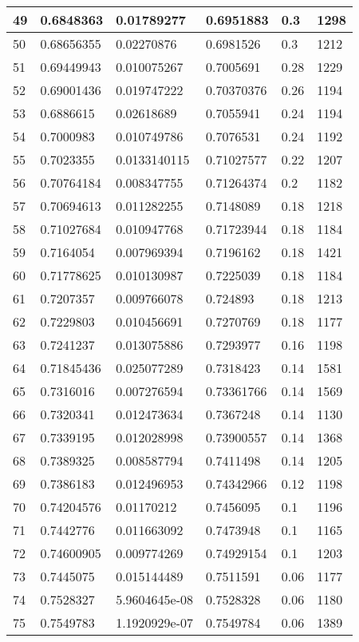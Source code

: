 \begin{longtable}{|l|l|l|l|l|l|}
49 & 0.6848363 & 0.01789277 & 0.6951883 & 0.3 & 1298 \\ \hline 
50 & 0.68656355 & 0.02270876 & 0.6981526 & 0.3 & 1212 \\ \hline 
51 & 0.69449943 & 0.010075267 & 0.7005691 & 0.28 & 1229 \\ \hline 
52 & 0.69001436 & 0.019747222 & 0.70370376 & 0.26 & 1194 \\ \hline 
53 & 0.6886615 & 0.02618689 & 0.7055941 & 0.24 & 1194 \\ \hline 
54 & 0.7000983 & 0.010749786 & 0.7076531 & 0.24 & 1192 \\ \hline 
55 & 0.7023355 & 0.0133140115 & 0.71027577 & 0.22 & 1207 \\ \hline 
56 & 0.70764184 & 0.008347755 & 0.71264374 & 0.2 & 1182 \\ \hline 
57 & 0.70694613 & 0.011282255 & 0.7148089 & 0.18 & 1218 \\ \hline 
58 & 0.71027684 & 0.010947768 & 0.71723944 & 0.18 & 1184 \\ \hline 
59 & 0.7164054 & 0.007969394 & 0.7196162 & 0.18 & 1421 \\ \hline 
60 & 0.71778625 & 0.010130987 & 0.7225039 & 0.18 & 1184 \\ \hline 
61 & 0.7207357 & 0.009766078 & 0.724893 & 0.18 & 1213 \\ \hline 
62 & 0.7229803 & 0.010456691 & 0.7270769 & 0.18 & 1177 \\ \hline 
63 & 0.7241237 & 0.013075886 & 0.7293977 & 0.16 & 1198 \\ \hline 
64 & 0.71845436 & 0.025077289 & 0.7318423 & 0.14 & 1581 \\ \hline 
65 & 0.7316016 & 0.007276594 & 0.73361766 & 0.14 & 1569 \\ \hline 
66 & 0.7320341 & 0.012473634 & 0.7367248 & 0.14 & 1130 \\ \hline 
67 & 0.7339195 & 0.012028998 & 0.73900557 & 0.14 & 1368 \\ \hline 
68 & 0.7389325 & 0.008587794 & 0.7411498 & 0.14 & 1205 \\ \hline 
69 & 0.7386183 & 0.012496953 & 0.74342966 & 0.12 & 1198 \\ \hline 
70 & 0.74204576 & 0.01170212 & 0.7456095 & 0.1 & 1196 \\ \hline 
71 & 0.7442776 & 0.011663092 & 0.7473948 & 0.1 & 1165 \\ \hline 
72 & 0.74600905 & 0.009774269 & 0.74929154 & 0.1 & 1203 \\ \hline 
73 & 0.7445075 & 0.015144489 & 0.7511591 & 0.06 & 1177 \\ \hline 
74 & 0.7528327 & 5.9604645e-08 & 0.7528328 & 0.06 & 1180 \\ \hline 
75 & 0.7549783 & 1.1920929e-07 & 0.7549784 & 0.06 & 1389 \\ \hline 
\end{longtable}